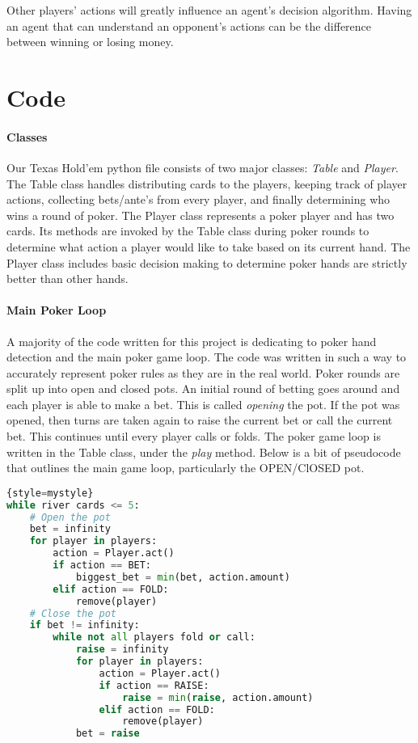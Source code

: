 \documentclass[10pt, a4paper, twocolumn]{article} %
\begin{document}
Other players' actions will greatly influence an agent's decision algorithm. Having an agent that can understand an opponent's actions can be the difference between winning or losing money.

\section{Code}
\paragraph{Classes}
Our Texas Hold'em python file consists of two major classes: \textit{Table} and \textit{Player}. The Table class handles distributing cards to the players, keeping track of player actions, collecting bets/ante's from every player, and finally determining who wins a round of poker. The Player class represents a poker player and has two cards. Its methods are invoked by the Table class during poker rounds to determine what action a player would like to take based on its current hand. The Player class includes basic decision making to determine poker hands are strictly better than other hands.

\paragraph{Main Poker Loop}
A majority of the code written for this project is dedicating to poker hand detection and the main poker game loop. The code was written in such a way to accurately represent poker rules as they are in the real world. Poker rounds are split up into open and closed pots. An initial round of betting goes around and each player is able to make a bet. This is called \textit{opening} the pot. If the pot was opened, then turns are taken again to raise the current bet or call the current bet. This continues until every player calls or folds. The poker game loop is written in the Table class, under the \textit{play} method. Below is a bit of pseudocode that outlines the main game loop, particularly the OPEN/ClOSED pot.

\lstset{style=mystyle}
\begin{lstlisting}[language=Python]{style=mystyle}
while river cards <= 5:
	# Open the pot
	bet = infinity
	for player in players:
		action = Player.act()
		if action == BET:
			biggest_bet = min(bet, action.amount)
		elif action == FOLD:
			remove(player)
	# Close the pot
	if bet != infinity:
		while not all players fold or call:
			raise = infinity
			for player in players:
				action = Player.act()
				if action == RAISE:
					raise = min(raise, action.amount)
				elif action == FOLD:
					remove(player)
			bet = raise
\end{lstlisting}
\end{document}
